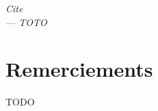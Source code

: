 
\begin{flushright}{\slshape    
  	 Cite \\ \medskip
  	 --- TOTO} 
\end{flushright}



\bigskip

\begingroup
\let\clearpage\relax
\let\cleardoublepage\relax
\let\cleardoublepage\relax
\chapter*{Remerciements}

TODO


\endgroup



